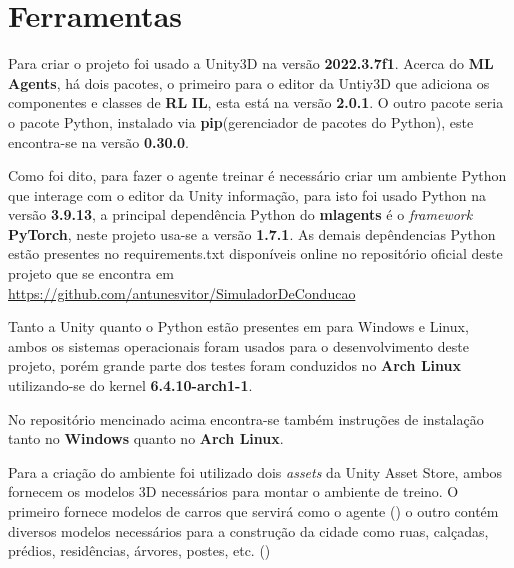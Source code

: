 \chapter{Ferramentas}\label{cap:ferramentas}

Para criar o projeto foi usado a Unity3D na versão \textbf{2022.3.7f1}. Acerca do \textbf{ML Agents}, há dois pacotes, o primeiro para o editor da Untiy3D que adiciona os componentes e classes de \textbf{RL} \textbf{IL}, esta está na versão \textbf{2.0.1}. O outro pacote seria o pacote Python, instalado via \textbf{pip}(gerenciador de pacotes do Python), este encontra-se na versão \textbf{0.30.0}. 

Como foi dito, para fazer o agente treinar é necessário criar um ambiente Python que interage com o editor da Unity informação, para isto foi usado Python na versão \textbf{3.9.13}, a principal dependência Python do \textbf{mlagents} é o \textit{framework} \textbf{PyTorch}, neste projeto usa-se a versão \textbf{1.7.1}. As demais depêndencias Python estão presentes no requirements.txt disponíveis online no repositório oficial deste projeto que se encontra em \href{https://github.com/antunesvitor/SimuladorDeConducao}{https://github.com/antunesvitor/SimuladorDeConducao}

Tanto a Unity quanto o Python estão presentes em para Windows e Linux, ambos os sistemas operacionais foram usados para o desenvolvimento deste projeto, porém grande parte dos testes foram conduzidos no \textbf{Arch Linux} utilizando-se do kernel \textbf{6.4.10-arch1-1}.


No repositório mencinado acima encontra-se também instruções de instalação tanto no \textbf{Windows} quanto no \textbf{Arch Linux}.

Para a criação do ambiente foi utilizado dois \textit{assets} da Unity Asset Store, ambos fornecem os modelos 3D necessários para montar o ambiente de treino. O primeiro fornece modelos de carros que servirá como o agente () o outro contém diversos modelos necessários para a construção da cidade como ruas, calçadas, prédios, residências, árvores, postes, etc. ()


